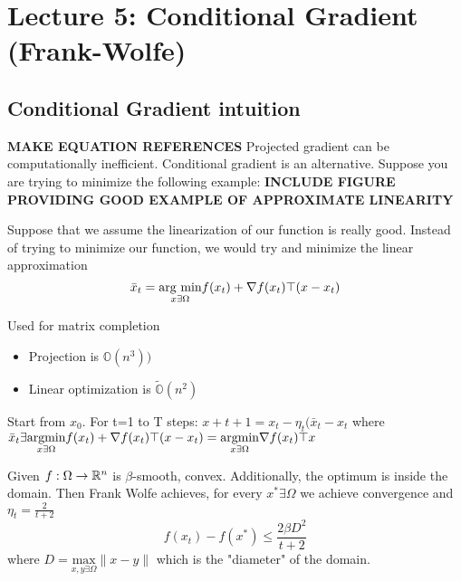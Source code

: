 \documentclass[12pt]{article}
\begin{document}
\section{Lecture 5: Conditional Gradient (Frank-Wolfe)}

\subsection{Conditional Gradient intuition}
\textbf{MAKE EQUATION REFERENCES}
Projected gradient can be computationally inefficient. Conditional gradient is an alternative. Suppose you are trying to minimize the following example: 
\textbf{INCLUDE FIGURE PROVIDING GOOD EXAMPLE OF APPROXIMATE LINEARITY}

Suppose that we assume the linearization of our function is really good. Instead of trying to minimize our function, we would try and minimize the linear approximation
\begin{equation}
\bar{x}_t = \underset{x \exists \Omega}{\text{arg min}} f(x_t) + \nabla f(x_t)\top (x-x_t) 
\end{equation}

\begin{example} 
Used for matrix completion
\begin{itemize}
\item Projection is $\mathbb{O}(n^3))$
\item Linear optimization is $\tilde{\mathbb{O}}(n^2)$
\end{itemize}
\end{example}

\begin{definition}
Start from $x_0$. For t=1 to T steps: $x+{t+1} = x_t - \eta_t(\bar{x}_t - x_t$ where $\bar{x}_t \exists \underset{x\exists \Omega}{\text{argmin}} f(x_t) + \nabla f(x_t)\top (x-x_t) = \underset{x\exists \Omega}{\text{argmin}} \nabla f(x_t)\top x$
\end{definition}

\begin{theorem}
Given $f:\Omega \rightarrow \mathbb{R}^n$ is $\beta$-smooth, convex. Additionally, the optimum is inside the domain. Then Frank Wolfe achieves, for every $x^* \exists \Omega$ we achieve convergence and $\eta_t = \frac{2}{t+2}$ 
\begin{equation}
f(x_t) - f(x^*) \leq \frac{2\beta D^2}{t+2}
\end{equation}
where $D = \underset{x,y\exists \Omega}{\text{max}}\|x-y\|$ which is the "diameter" of the domain. 
\end{theorem}
\end{document}
